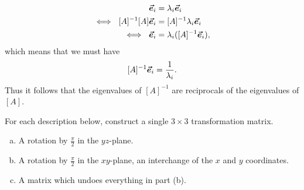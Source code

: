 \documentclass[12pt]{article} %
\begin{document}
\begin{solution}
\begin{enumerate}[(a)]
    \begin{align*}
        [A]\evec_i &= \lambda_i \evec_i\\
        \iff ~ [A]^{-1}[A]\evec_i &= [A]^{-1}\lambda_i \evec_i\\
        \iff ~ \evec_i &= \lambda_i ([A]^{-1} \evec_i),
    \end{align*}
    which means that we must have
    \[
    [A]^{-1} \boldsymbol{\vec{e}}_i = \frac{1}{\lambda_i}.
    \]
    Thus it follows that the eigenvalues of $[A]^{-1}$ are reciprocals of the eigenvalues of $[A]$.
\end{enumerate}
\end{solution}

\newpage
\begin{problem}
For each description below, construct a single $3\times 3$ transformation matrix.
\begin{enumerate}[(a)]
    \item A rotation by $\frac{\pi}{2}$ in the $yz$-plane.
    \item A rotation by $\frac{\pi}{2}$ in the $xy$-plane, an interchange of the $x$ and $y$ coordinates.
    \item A matrix which undoes everything in part (b).
\end{enumerate}
\end{problem}
\end{document}
